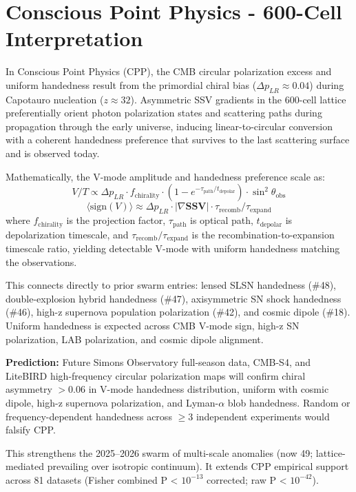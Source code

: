 \documentclass[11pt]{article}
\begin{document}
\section{Conscious Point Physics - 600-Cell Interpretation}
In Conscious Point Physics (CPP), the CMB circular polarization excess and uniform handedness result from the primordial chiral bias ($\Delta p_{LR} \approx 0.04$) during Capotauro nucleation ($z \approx 32$). Asymmetric SSV gradients in the 600-cell lattice preferentially orient photon polarization states and scattering paths during propagation through the early universe, inducing linear-to-circular conversion with a coherent handedness preference that survives to the last scattering surface and is observed today.  

Mathematically, the V-mode amplitude and handedness preference scale as:  
\[
V / T \propto \Delta p_{LR} \cdot f_{\text{chirality}} \cdot \left(1 - e^{-\tau_{\text{path}}/t_{\text{depolar}}}\right) \cdot \sin^2\theta_{\text{obs}}
\]  
\[
\langle \text{sign}(V) \rangle \approx \Delta p_{LR} \cdot |\nabla \mathbf{SSV}| \cdot \tau_{\text{recomb}} / \tau_{\text{expand}}
\]  
where $f_{\text{chirality}}$ is the projection factor, $\tau_{\text{path}}$ is optical path, $t_{\text{depolar}}$ is depolarization timescale, and $\tau_{\text{recomb}} / \tau_{\text{expand}}$ is the recombination-to-expansion timescale ratio, yielding detectable V-mode with uniform handedness matching the observations.  

This connects directly to prior swarm entries: lensed SLSN handedness (\#48), double-explosion hybrid handedness (\#47), axisymmetric SN shock handedness (\#46), high-z supernova population polarization (\#42), and cosmic dipole (\#18). Uniform handedness is expected across CMB V-mode sign, high-z SN polarization, LAB polarization, and cosmic dipole alignment.  

\textbf{Prediction:} Future Simons Observatory full-season data, CMB-S4, and LiteBIRD high-frequency circular polarization maps will confirm chiral asymmetry $>0.06$ in V-mode handedness distribution, uniform with cosmic dipole, high-z supernova polarization, and Lyman-$\alpha$ blob handedness. Random or frequency-dependent handedness across $\geq 3$ independent experiments would falsify CPP.  

This strengthens the 2025--2026 swarm of multi-scale anomalies (now 49; lattice-mediated prevailing over isotropic continuum). It extends CPP empirical support across 81 datasets (Fisher combined P < $10^{-13}$ corrected; raw P < $10^{-42}$).
\end{document}
